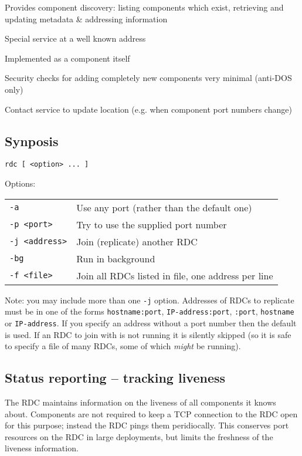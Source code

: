 \documentclass[12pt,a4paper,twoside]{article}
\renewcommand{\_}{\texttt{\symbol{95}}}
\begin{document}
\begin{bulletlist}
\item Provides component discovery: listing components which exist,
		retrieving and updating metadata \& addressing information
\item Special service at a well known address
\item Implemented as a component itself
\item Security checks for adding completely new components very minimal
	(anti-DOS only)
\item Contact service to update location (e.g. when component port numbers
	change)
\end{bulletlist}

\subsection{Synposis}

\verb^rdc [ <option> ... ]^

Options:

\begin{tabular}{ll}
\verb^-a^ & Use any port (rather than the default one)\\
\verb^-p <port>^ & Try to use the supplied port number\\
\verb^-j <address>^ & Join (replicate) another RDC\\
\verb^-bg^ & Run in background\\
\verb^-f <file>^ & Join all RDCs listed in file, one address per line\\
\end{tabular}

Note: you may include more than one \verb^-j^ option.
Addresses of RDCs to replicate must be in one of the forms
\verb^hostname:port^, \verb^IP-address:port^, \verb^:port^,
\verb^hostname^ or \verb^IP-address^.
If you specify an address without a port number then the default is used.
If an RDC to join with is not running it is silently skipped
(so it is safe to specify a file of many RDCs, some of which \textit{might}
be running).

\subsection{Status reporting -- tracking liveness}

The RDC maintains information on the liveness of all components it
knows about. Components are not required to keep a TCP connection to
the RDC open for this purpose; instead the RDC pings them peridiocally.
This conserves port resources on the RDC in large deployments, but
limits the freshness of the liveness information.
\end{document}
